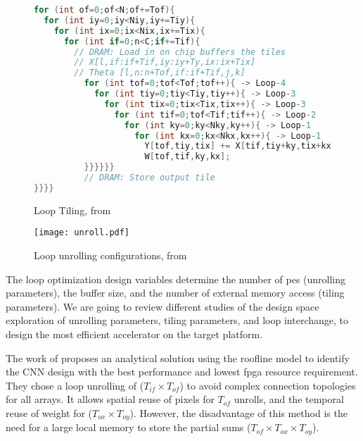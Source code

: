 \begin{figure}[H]
\centering
\begin{lstlisting}[language=Java]
for (int of=0;of<N;of+=Tof){
  for (int iy=0;iy<Niy,iy+=Tiy){
    for (int ix=0;ix<Nix,ix+=Tix){
      for (int if=0;n<C;if+=Tif){
        // DRAM: Load in on chip buffers the tiles
        // X[l,if:if+Tif,iy:iy+Ty,ix:ix+Tix]
        // Theta [l,n:n+Tof,if:if+Tif,j,k]
          for (int tof=0;tof<Tof;tof++){ -> Loop-4
            for (int tiy=0;tiy<Tiy,tiy++){ -> Loop-3
              for (int tix=0;tix<Tix,tix++){ -> Loop-3
                for (int tif=0;tof<Tif;tif++){ -> Loop-2
                  for (int ky=0;ky<Nky,ky++){ -> Loop-1
                    for (int kx=0;kx<Nkx,kx++){ -> Loop-1
                      Y[tof,tiy,tix] += X[tif,tiy+ky,tix+kx] *
                      W[tof,tif,ky,kx];
          }}}}}}
          // DRAM: Store output tile
}}}}
    \end{lstlisting}
    \caption{Loop Tiling, from \cite{abdelouahab_accelerating_2018}}
    \label{fig:looptiling}
\end{figure}
%
\begin{figure}[H]
    \centering
    \texttt{[image: unroll.pdf]}
    \caption{Loop unrolling configurations, from \cite{ma_optimizing_2018}}
    \label{fog:unroll}
\end{figure}

The loop optimization design variables determine the number of \acrshort{pe}s (unrolling parameters), the buffer size, and the number of external memory access (tiling parameters). We are going to review different studies of the design space exploration of unrolling parameters, tiling parameters, and loop interchange, to design the most efficient accelerator on the target platform.

The work of \textcite{zhang_optimizing_2015} proposes an analytical solution using the roofline model \cite{williams_roofline_2009} to identify the CNN design with the best performance and lowest \acrshort{fpga} resource requirement. They chose a loop unrolling of ($T_{if} \times T_{of}$) to avoid complex connection topologies for all arrays. It allows spatial reuse of pixels for $T_{of}$ unrolls, and the temporal reuse of weight for ($T_{ox} \times T_{oy}$). However, the disadvantage of this method is the need for a large local memory to store the partial sums ($T_{of} \times T_{ox} \times T_{oy}$).

